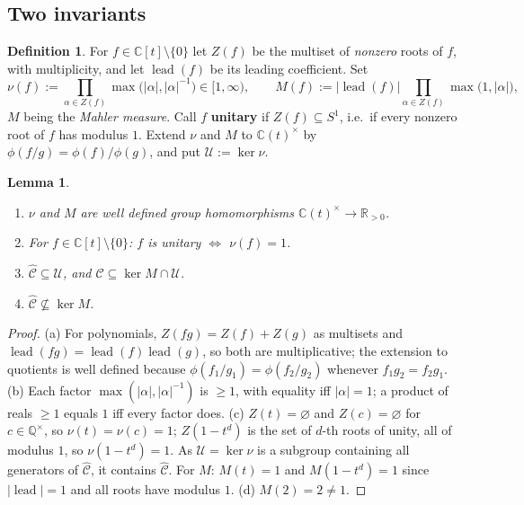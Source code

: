 \documentclass[11pt]{article}
\newtheorem{lemma}[theorem]{Lemma}
\theoremstyle{definition}
\newtheorem{definition}[theorem]{Definition}
\DeclareMathOperator{\lead}{lead}
\newcommand{\QQ}{\mathbb{Q}}
\newcommand{\CC}{\mathbb{C}}
\newcommand{\RR}{\mathbb{R}}
\newcommand{\Chat}{\widehat{\mathcal{C}}}
\newcommand{\Scirc}{S^1}
\begin{document}
\subsection{Two invariants}

\begin{definition}\label{def:nu}
For $f\in\CC[t]\setminus\{0\}$ let $Z(f)$ be the multiset of \emph{nonzero} roots of $f$, with
multiplicity, and let $\lead(f)$ be its leading coefficient. Set
\[
  \nu(f):=\prod_{\alpha\in Z(f)}\max\bigl(|\alpha|,|\alpha|^{-1}\bigr)\in[1,\infty),
  \qquad
  M(f):=|\lead(f)|\prod_{\alpha\in Z(f)}\max\bigl(1,|\alpha|\bigr),
\]
$M$ being the \emph{Mahler measure}. Call $f$ \textbf{unitary} if $Z(f)\subseteq \Scirc$, i.e.\ if
every nonzero root of $f$ has modulus $1$. Extend $\nu$ and $M$ to $\CC(t)^\times$ by
$\phi(f/g)=\phi(f)/\phi(g)$, and put $\mathcal{U}:=\ker\nu$.
\end{definition}

\begin{lemma}\label{lem:hom}
\begin{enumerate}
\item[(a)] $\nu$ and $M$ are well defined group homomorphisms $\CC(t)^\times\to\RR_{>0}$.
\item[(b)] For $f\in\CC[t]\setminus\{0\}$: $f$ is unitary $\iff$ $\nu(f)=1$.
\item[(c)] $\Chat\subseteq\mathcal{U}$, and $\mathcal{C}\subseteq\ker M\cap\mathcal{U}$.
\item[(d)] $\Chat\not\subseteq\ker M$.
\end{enumerate}
\end{lemma}

\begin{proof}
(a) For polynomials, $Z(fg)=Z(f)+Z(g)$ as multisets and $\lead(fg)=\lead(f)\lead(g)$, so both
are multiplicative; the extension to quotients is well defined because
$\phi(f_1/g_1)=\phi(f_2/g_2)$ whenever $f_1g_2=f_2g_1$.
(b) Each factor $\max(|\alpha|,|\alpha|^{-1})$ is $\ge1$, with equality iff $|\alpha|=1$; a
product of reals $\ge1$ equals $1$ iff every factor does.
(c) $Z(t)=\varnothing$ and $Z(c)=\varnothing$ for $c\in\QQ^\times$, so $\nu(t)=\nu(c)=1$;
$Z(1-t^{d})$ is the set of $d$-th roots of unity, all of modulus $1$, so $\nu(1-t^{d})=1$. As
$\mathcal{U}=\ker\nu$ is a subgroup containing all generators of $\Chat$, it contains $\Chat$.
For $M$: $M(t)=1$ and $M(1-t^d)=1$ since $|\lead|=1$ and all roots have modulus $1$.
(d) $M(2)=2\ne1$.
\end{proof}
\end{document}

